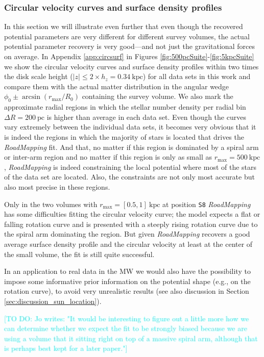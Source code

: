 \documentclass[iop,revtex4,numberedappendix,appendixfloats]{emulateapj}
\newcommand{\RM}{{\sl RoadMapping}}
\newcommand{\Jo}[1]{\textcolor{Cyan}{#1}}
\begin{document}
\subsubsection{Circular velocity curves and surface density profiles} \label{sec:circvel_surfdens}

In this section we will illustrate even further that even though the recovered potential parameters are very different for different survey volumes, the actual potential parameter recovery is very good---and not just the gravitational forces on average. In Appendix \ref{app:circsurf} in Figures \ref{fig:500pcSuite}-\ref{fig:5kpcSuite} we show the circular velocity curves and surface density profiles within two times the disk scale height ($|z|\leq 2 \times h_z = 0.34~\text{kpc}$) for all data sets in this work and compare them with the actual matter distribution in the angular wedge $\phi_0\pm \arcsin(r_\text{max}/R_0)$ containing the survey volume. We also mark the approximate radial regions in which the stellar number density per radial bin $\Delta R =200~\text{pc}$ is higher than average in each data set. Even though the curves vary extremely between the individual data sets, it becomes very obvious that it is indeed the regions in which the majority of stars is located that drives the \RM{} fit. And that, no matter if this region is dominated by a spiral arm or inter-arm region and no matter if this region is only as small as $r_\text{max}=500~\text{kpc}$, \RM{} is indeed constraining the local potential where most of the stars of the data set are located. Also, the constraints are not only most accurate but also most precise in these regions.

Only in the two volumes with $r_\text{max}=[0.5,1]~\text{kpc}$ at position \texttt{S8} \RM{} has some difficulties fitting the circular velocity curve; the model expects a flat or falling rotation curve and is presented with a steeply rising rotation curve due to the spiral arm dominating the region. But given \RM{} recovers a good average surface density profile and the circular velocity at least at the center of the small volume, the fit is still quite successful. 

In an application to real data in the MW we would also have the possibility to impose some informative prior information on the potential shape (e.g., on the rotation curve), to avoid very unrealistic results (see also discussion in Section \ref{sec:discussion_sun_location}).

\Jo{[TO DO: Jo writes: "It would be interesting to figure out a little more how we can determine whether we expect the fit to be strongly biased because we are using a volume that it sitting right on top of a massive spiral arm, although that is perhaps best kept for a later paper."]}
\end{document}
